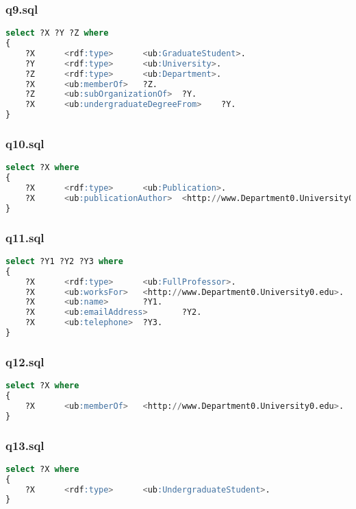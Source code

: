 \documentclass[titlepage, a4paper, 12pt] {article}
\begin{document}
\subsubsection{q9.sql}

\begin{lstlisting}[language=SQL]
select ?X ?Y ?Z where
{
	?X      <rdf:type>      <ub:GraduateStudent>.
	?Y      <rdf:type>      <ub:University>.
	?Z      <rdf:type>      <ub:Department>.
	?X      <ub:memberOf>   ?Z.
	?Z      <ub:subOrganizationOf>  ?Y.
	?X      <ub:undergraduateDegreeFrom>    ?Y.
}    
\end{lstlisting}

\subsubsection{q10.sql}

\begin{lstlisting}[language=SQL]
select ?X where
{
	?X      <rdf:type>      <ub:Publication>.
	?X      <ub:publicationAuthor>  <http://www.Department0.University0.edu/AssistantProfessor0>.
}
\end{lstlisting}

\subsubsection{q11.sql}

\begin{lstlisting}[language=SQL]
select ?Y1 ?Y2 ?Y3 where
{
	?X      <rdf:type>      <ub:FullProfessor>.
	?X      <ub:worksFor>   <http://www.Department0.University0.edu>.
	?X      <ub:name>       ?Y1.
	?X      <ub:emailAddress>       ?Y2.
	?X      <ub:telephone>  ?Y3.
}
\end{lstlisting}

\subsubsection{q12.sql}

\begin{lstlisting}[language=SQL]
select ?X where
{
	?X      <ub:memberOf>   <http://www.Department0.University0.edu>.
}
\end{lstlisting}

\subsubsection{q13.sql}

\begin{lstlisting}[language=SQL]
select ?X where
{
	?X      <rdf:type>      <ub:UndergraduateStudent>.
}
\end{lstlisting}
\end{document}
